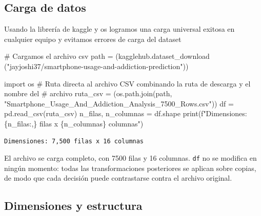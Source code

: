 \documentclass[11pt,spanish,a4paper,]{article}
\newenvironment{Shaded}{\begin{snugshade}}{\end{snugshade}}
\newcommand{\BuiltInTok}[1]{\textcolor[rgb]{0.00,0.23,0.31}{#1}}
\newcommand{\CommentTok}[1]{\textcolor[rgb]{0.37,0.37,0.37}{#1}}
\newcommand{\ImportTok}[1]{\textcolor[rgb]{0.00,0.46,0.62}{#1}}
\newcommand{\NormalTok}[1]{\textcolor[rgb]{0.00,0.23,0.31}{#1}}
\newcommand{\OperatorTok}[1]{\textcolor[rgb]{0.37,0.37,0.37}{#1}}
\newcommand{\SpecialCharTok}[1]{\textcolor[rgb]{0.37,0.37,0.37}{#1}}
\newcommand{\SpecialStringTok}[1]{\textcolor[rgb]{0.13,0.47,0.30}{#1}}
\newcommand{\StringTok}[1]{\textcolor[rgb]{0.13,0.47,0.30}{#1}}
\begin{document}
\subsection{Carga de datos}\label{carga-de-datos}

Usando la librería de kaggle y os logramos una carga universal exitosa
en cualquier equipo y evitamos errores de carga del dataset

\newpage

\protect{}\label{carga-dataset}
\begin{Shaded}
\begin{Highlighting}[]
\CommentTok{\# Cargamos el archivo csv}
\NormalTok{path }\OperatorTok{=}\NormalTok{ (kagglehub.dataset\_download }
\NormalTok{       (}\StringTok{"jayjoshi37/smartphone{-}usage{-}and{-}addiction{-}prediction"}\NormalTok{))}

\ImportTok{import}\NormalTok{ os}
\CommentTok{\# Ruta directa al archivo CSV combinando la ruta de descarga y el nombre del}
\CommentTok{\# archivo}
\NormalTok{ruta\_csv }\OperatorTok{=}\NormalTok{ (os.path.join(path, }
           \StringTok{"Smartphone\_Usage\_And\_Addiction\_Analysis\_7500\_Rows.csv"}\NormalTok{))}
\NormalTok{df }\OperatorTok{=}\NormalTok{ pd.read\_csv(ruta\_csv)}
\NormalTok{n\_filas, n\_columnas }\OperatorTok{=}\NormalTok{ df.shape}
\BuiltInTok{print}\NormalTok{(}\SpecialStringTok{f"Dimensiones: }\SpecialCharTok{\{}\NormalTok{n\_filas}\SpecialCharTok{:,\}}\SpecialStringTok{ filas x }\SpecialCharTok{\{}\NormalTok{n\_columnas}\SpecialCharTok{\}}\SpecialStringTok{ columnas"}\NormalTok{)}
\end{Highlighting}
\end{Shaded}

\begin{verbatim}
Dimensiones: 7,500 filas x 16 columnas
\end{verbatim}

El archivo se carga completo, con 7500 filas y 16 columnas. \texttt{df}
no se modifica en ningún momento: todas las transformaciones posteriores
se aplican sobre copias, de modo que cada decisión puede contrastarse
contra el archivo original.

\subsection{Dimensiones y estructura}\label{dimensiones-y-estructura}
\end{document}
